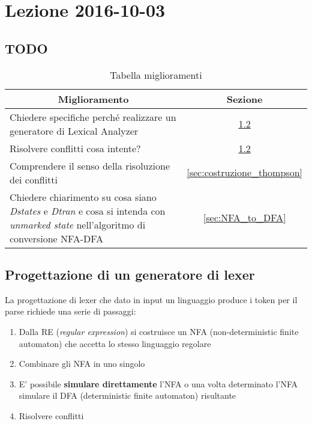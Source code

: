 \section{Lezione 2016-10-03}
\subsection{TODO}
\begin{table}[H]
\begin{center}
\begin{tabular}{|p{\textwidth}|c|}
\hline
\multicolumn{1}{|c|}{\textbf{Miglioramento}} & \textbf{Sezione} \\ \hline
Chiedere specifiche perché realizzare un generatore di Lexical Analyzer
& \ref{sec:lexer_generatore} \\ \hline
Risolvere conflitti cosa intente? & \ref{sec:lexer_generatore} \\ \hline
Comprendere il senso della risoluzione dei conflitti &
\ref{sec:costruzione_thompson} \\ \hline
Chiedere chiarimento su cosa siano \textit{Dstates} e \textit{Dtran} e cosa si
intenda con \textit{unmarked state} nell'algoritmo di conversione NFA-DFA &
\ref{sec:NFA_to_DFA} \\ \hline
\end{tabular}
\end{center}
\caption{Tabella miglioramenti}
\label{tab:tab_todo}
\end{table}

\subsection{Progettazione di un generatore di lexer}
\label{sec:lexer_generatore}
La progettazione di lexer che dato in input un linguaggio produce i token per il
parse richiede una serie di passaggi:
\begin{enumerate}
\item Dalla RE (\textit{regular expression}) si costruisce un NFA
(non-deterministic finite automaton) che accetta lo stesso linguaggio regolare
\item Combinare gli NFA in uno singolo
\item E' possibile \textbf{simulare direttamente} l'NFA o una volta determinato
l'NFA simulare il DFA (deterministic finite automaton) risultante
\item Risolvere conflitti
\end{enumerate}

